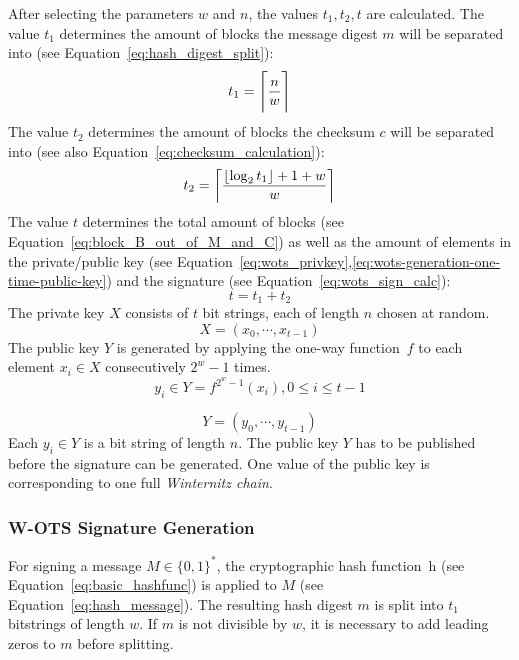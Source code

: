 After selecting the parameters $w$ and $n$, the values $t_1, t_2, t$ are calculated.
The value $t_1$ determines the amount of blocks the message digest $m$ will be separated into (see Equation~\ref{eq:hash_digest_split}):
\begin{equation}
\label{eq:t1}
t_1 = \ceil[\Bigg]{\frac{n}{w}}
\end{equation}
The value $t_2$ determines the amount of blocks the checksum $c$ will be separated into (see also Equation~\ref{eq:checksum_calculation}):
\begin{equation}
\label{eq:t2}
t_2 = \ceil*{\frac{\floor*{\log_2 t_1} + 1 + w}{w} }
\end{equation}
The value $t$ determines the total amount of blocks (see Equation~\ref{eq:block_B_out_of_M_and_C}) as well as the amount of elements in the private/public key (see Equation~\ref{eq:wots_privkey},\ref{eq:wots-generation-one-time-public-key}) and the signature (see Equation~\ref{eq:wots_sign_calc}):
\begin{equation}
\label{eq:t}
t = t_1 + t_2
\end{equation}
The private key $X$ consists of $t$ bit strings, each of length $n$ chosen at random.
\begin{equation}
\label{eq:wots_privkey}
X = (x_0, \cdots, x_{t-1})
\end{equation}
The public key $Y$ is generated by applying the one-way function~$f$ to each element $x_i  \in X$  consecutively $2^w - 1$ times. %
\begin{equation}
\label{eq:wots-generation-one-time-public-key}
y_i \in Y =  f^{2^w-1}(x_i), 0 \leq i \leq t-1 
\end{equation}

\begin{equation}
Y = (y_0, \cdots, y_{t-1})
\end{equation}
Each $y_i \in Y$ is a bit string of length $n$. The public key $Y$ has to be published before the signature can be generated. One value of the public key is corresponding to one full \textit{Winternitz chain}. %

\subsubsection{W-OTS Signature Generation}
For signing a message $M \in \lbrace 0,1 \rbrace^*$, the cryptographic hash function~h (see Equation~\ref{eq:basic_hashfunc}) is applied to $M$ (see Equation~\ref{eq:hash_message}). The resulting hash digest $m$ is split into $t_1$ bitstrings of length $w$. If $m$ is not divisible by $w$, it is necessary to add leading zeros to $m$ before splitting.

